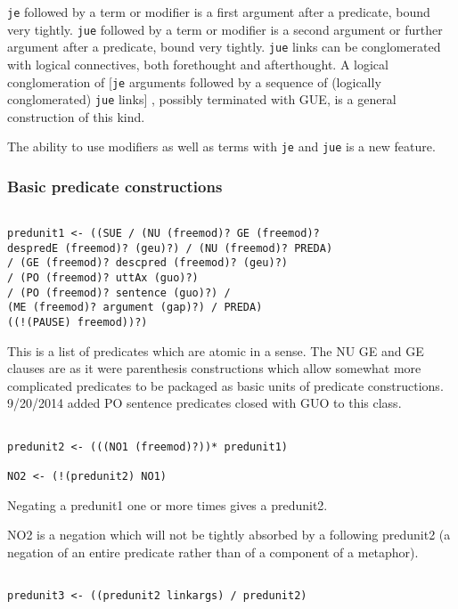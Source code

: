 \documentclass[12pt]{article}
\begin{document}
{\tt je} followed by a term or modifier is a first argument after a predicate, bound very tightly.  {\tt jue} followed by
a term or modifier is a second argument or further argument after a predicate, bound very tightly.  {\tt jue} links can be conglomerated with
logical connectives, both forethought and afterthought.  A logical conglomeration of [{\tt je} arguments followed by 
a sequence of (logically conglomerated) {\tt jue} links] , possibly terminated with GUE, is a general construction of this kind.

The ability to use modifiers as well as terms with {\tt je} and {\tt jue} is a new feature.

\subsubsection{Basic predicate constructions}

\begin{verbatim}

predunit1 <- ((SUE / (NU (freemod)? GE (freemod)? 
despredE (freemod)? (geu)?) / (NU (freemod)? PREDA) 
/ (GE (freemod)? descpred (freemod)? (geu)?) 
/ (PO (freemod)? uttAx (guo)?) 
/ (PO (freemod)? sentence (guo)?) /
(ME (freemod)? argument (gap)?) / PREDA) 
((!(PAUSE) freemod))?)

\end{verbatim}

This is a list of predicates which are atomic in a sense.  The NU GE and GE clauses are as it were parenthesis constructions which allow somewhat more complicated predicates to be packaged as basic units of predicate constructions.  9/20/2014  added PO sentence predicates closed with GUO to this class.

\begin{verbatim}

predunit2 <- (((NO1 (freemod)?))* predunit1)

NO2 <- (!(predunit2) NO1)

\end{verbatim}

Negating a predunit1 one or more times gives a predunit2.

NO2 is a negation which will not be tightly absorbed by a following predunit2 (a negation of an entire predicate rather
than of a component of a metaphor).

\begin{verbatim}

predunit3 <- ((predunit2 linkargs) / predunit2)

\end{verbatim}
\end{document}
